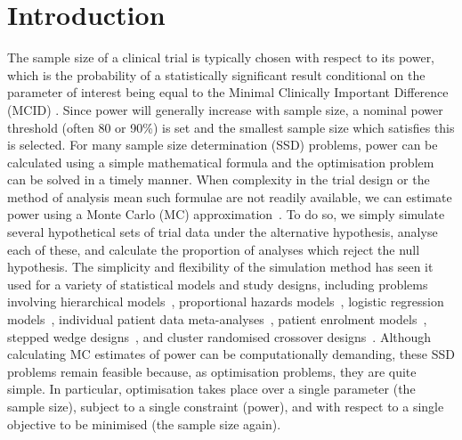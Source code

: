 \documentclass[sagev, Crown]{sagej}
\begin{document}
\section{Introduction}\label{sec:intro}

The sample size of a clinical trial is typically chosen with respect to its power, which is the probability of a statistically significant result conditional on the parameter of interest being equal to the Minimal Clinically Important Difference (MCID) \cite{Cook2018}. Since power will generally increase with sample size, a nominal power threshold (often 80 or 90\%) is set and the smallest sample size which satisfies this is selected. For many sample size determination (SSD) problems, power can be calculated using a simple mathematical formula and the optimisation problem can be solved in a timely manner. When complexity in the trial design or the method of analysis mean such formulae are not readily available, we can estimate power using a Monte Carlo (MC) approximation~\cite{Arnold2011, Landau2013}. To do so, we simply simulate several hypothetical sets of trial data under the alternative hypothesis, analyse each of these, and calculate the proportion of analyses which reject the null hypothesis. The simplicity and flexibility of the simulation method has seen it used for a variety of statistical models and study designs, including problems involving hierarchical models~\cite{Feng1992, Hooper2013}, proportional hazards models~\cite{Schoenfeld2005}, logistic regression models~\cite{Grieve2016}, individual patient data meta-analyses~\cite{Sutton2007}, patient enrolment models~\cite{Fedorov2005}, stepped wedge designs~\cite{Baio2015, Hooper2016}, and cluster randomised crossover designs~\cite{Reich2012}. Although calculating MC estimates of power can be computationally demanding, these SSD problems remain feasible because, as optimisation problems, they are quite simple. In particular, optimisation takes place over a single parameter (the sample size), subject to a single constraint (power), and with respect to a single objective to be minimised (the sample size again).
\end{document}
